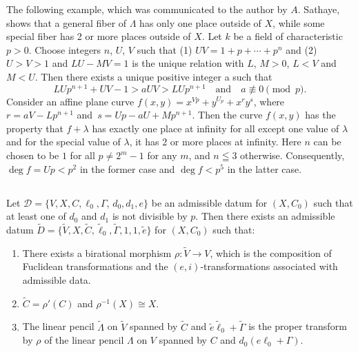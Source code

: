 The following example, which was communicated to the author by
$A$. Sathaye, shows that a general fiber of $\Lambda$ has only one place
outside of $X$, while some special fiber has 2 or more places outside
of $X$. Let $k$ be a field of characteristic $p>0$. Choose integers
$n$, $U$, $V$ such that (1) $UV=1+p+\cdots+p^{n}$ and (2) $U>V>1$ and
$LU-MV=1$ is the unique relation with $L$, $M>0$, $L<V$ and
$M<U$. Then there exists a unique positive integer a such that
$$
LUp^{n+1}+UV-1>aUV>LUp^{n+1}\quad\text{and}\quad a\not\equiv 0 \pmod{p}.
$$
Consider an affine plane curve $f(x,y)=x^{Vp}+y^{U_{p}}+x^{r}y^{s}$,
where $r=aV-Lp^{n+1}$ and\pageoriginale\ $s=Up-aU+Mp^{n+1}$. Then the
curve $f(x,y)$ has the property that $f+\lambda$ has exactly one place
at infinity for all except one value of $\lambda$ and for the special
value of $\lambda$, it has 2 or more places at infinity. Here $n$ can
be chosen to be $1$ for all $p\neq 2^{m}-1$ for any $m$, and $n\leqq
3$ otherwise. Consequently, $\deg f=Up<p^{2}$ in the former case and
$\deg f<p^{5}$ in the latter case.

\subsection{}\label{chap2:1.10}
\begin{coro*}
  Let $\mathscr{D}=\{V,X,C,\ell_{0},\Gamma$, $d_{0},d_{1},e\}$ be an
  admissible datum for $(X,C_{0})$ such that at least one of $d_{0}$ and
  $d_{1}$ is not divisible by $p$. Then there exists an admissible datum
  $\widetilde{D}=\{\widetilde{V},X,\widetilde{C},\widetilde{\ell}_{0},
  \widetilde{\Gamma},1,1,\widetilde{e}\}$ 
  for $(X,C_{0})$ such that:
  \begin{enumerate}
    \renewcommand{\labelenumi}{\rm(\theenumi)}
  \item There exists a birational morphism $\rho:\widetilde{V}\to V$,
    which is the composition of Fuclidean transformations and the
    $(e,i)$-transfor\-mations associated with admissible data.
    
  \item $\widetilde{C}=\rho'(C)$ and $\rho^{-1}(X)\cong X$.
    
  \item The linear pencil $\widetilde{\Lambda}$ on $\widetilde{V}$
    spanned by $\widetilde{C}$ and
    $\widetilde{e}\widetilde{\ell}_{0}+\widetilde{\Gamma}$ is the proper
    transform by $\rho$ of the linear pencil $\Lambda$ on $V$ spanned by
    $C$ and $d_{0}(e\ell_{0}+\Gamma)$.
  \end{enumerate}
\end{coro*}

